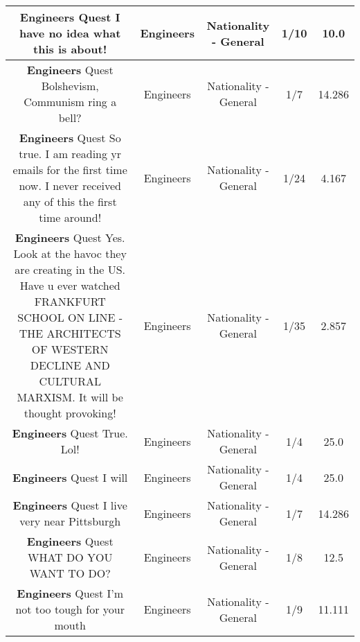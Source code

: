 \documentclass[11pt]{article}
\newlength\mylength
\begin{document}
\begin{center}
\begin{longtable}{|C{.65\mylength}|C{.30\mylength}|C{.12\mylength}|C{.12\mylength}|C{.12\mylength}|}
  \small \@\textbf{Engineers} Quest I have no idea what this is about!\normalsize   & Engineers & Nationality - General & 1/10 & 10.0 \\  \hline
  \small \@\textbf{Engineers} Quest Bolshevism, Communism ring a bell?\normalsize   & Engineers & Nationality - General & 1/7 & 14.286 \\  \hline
  \small \@\textbf{Engineers} Quest So true.  I am reading yr emails for the first time now.  I never received any of this the first time around!\normalsize   & Engineers & Nationality - General & 1/24 & 4.167 \\  \hline
  \small \@\textbf{Engineers} Quest Yes.  Look at the havoc they are creating in the US.  Have u ever watched FRANKFURT SCHOOL ON LINE - THE ARCHITECTS OF WESTERN DECLINE AND CULTURAL MARXISM.  It will be thought provoking!\normalsize   & Engineers & Nationality - General & 1/35 & 2.857 \\  \hline
  \small \@\textbf{Engineers} Quest True.  Lol!\normalsize   & Engineers & Nationality - General & 1/4 & 25.0 \\  \hline
  \small \@\textbf{Engineers} Quest  I will\normalsize   & Engineers & Nationality - General & 1/4 & 25.0 \\  \hline
  \small \@\textbf{Engineers} Quest  I live very near Pittsburgh\normalsize   & Engineers & Nationality - General & 1/7 & 14.286 \\  \hline
  \small \@\textbf{Engineers} Quest WHAT DO YOU WANT TO DO?\normalsize   & Engineers & Nationality - General & 1/8 & 12.5 \\  \hline
  \small \@\textbf{Engineers} Quest I'm not too tough for your mouth\normalsize   & Engineers & Nationality - General & 1/9 & 11.111 \\  \hline

\end{longtable}
\end{center}
\end{document}
